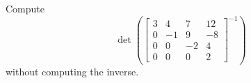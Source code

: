 \begin{exercise}
Compute
\begin{equation*}
\det \left( \begin{bmatrix}
3 & 4 & 7 & 12 \\
0 & -1 & 9 & -8 \\
0 & 0 & -2 & 4 \\
0 & 0 & 0 & 2
\end{bmatrix}^{-1}
\right)
\end{equation*}
without computing the inverse.
\end{exercise}
